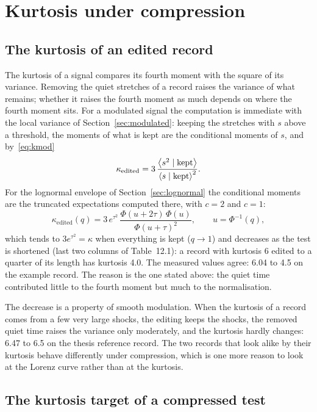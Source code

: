 \section{Kurtosis under compression}\label{sec:compressedk}

\subsection{The kurtosis of an edited record}

The kurtosis of a signal compares its fourth moment with the square of its variance. Removing the
quiet stretches of a record raises the variance of what remains; whether it raises the fourth moment as
much depends on where the fourth moment sits. For a modulated signal the computation is immediate with
the local variance of Section~\ref{sec:modulated}: keeping the stretches with $s$ above a threshold,
the moments of what is kept are the conditional moments of $s$, and by~\eqref{eq:kmod}
\begin{equation}\label{eq:kedited}
  \kappa_{\mathrm{edited}} = 3\,\frac{\left\langle s^2 \mid \text{kept} \right\rangle}{\left\langle s\mid\text{kept} \right\rangle^2} .
\end{equation}
For the lognormal envelope of Section~\ref{sec:lognormal} the conditional moments are the truncated
expectations computed there, with $c = 2$ and $c = 1$:
\begin{equation}
  \kappa_{\mathrm{edited}}(q) = 3\,e^{\tau^2}\,\frac{\Phi(u+2\tau)\,\Phi(u)}{\Phi(u+\tau)^2},
  \qquad u = \Phi^{-1}(q),
\end{equation}
which tends to $3e^{\tau^2} = \kappa$ when everything is kept ($q\to1$) and decreases as the test is
shortened (last two columns of Table~12.1): a record with kurtosis 6 edited to a quarter of its length
has kurtosis 4.0. The measured values agree: 6.04 to 4.5 on the example record. The reason is the
one stated above: the quiet time contributed little to the fourth moment but much to the normalisation.

The decrease is a property of smooth modulation. When the kurtosis of a record comes from a few very
large shocks, the editing keeps the shocks, the removed quiet time raises the variance only moderately,
and the kurtosis hardly changes: 6.47 to 6.5 on the thesis reference record. The two records that look
alike by their kurtosis behave differently under compression, which is one more reason to look at the
Lorenz curve rather than at the kurtosis.

\subsection{The kurtosis target of a compressed test}

